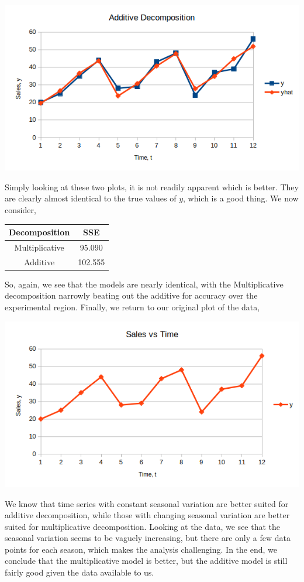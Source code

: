 \documentclass[letterpaper,10pt]{article}
\begin{document}
\begin{enumerate}
\begin{enumerate}
\begin{center}
\includegraphics[scale=0.8]{addhat.png}
\end{center}
Simply looking at these two plots, it is not readily apparent which is better. They are clearly almost identical to the true values of $y$, which is a good thing. We now consider,
\begin{center}
\begin{tabular}{|c|c|}
\hline
Decomposition & SSE\\\hline
Multiplicative & 95.090\\
Additive & 102.555\\\hline
\end{tabular}
\end{center}
So, again, we see that the models are nearly identical, with the Multiplicative decomposition narrowly beating out the additive for accuracy over the experimental region. Finally, we return to our original plot of the data,
\begin{center}
\includegraphics[scale=0.8]{oligopoly.png}
\end{center}
We know that time series with constant seasonal variation are better suited for additive decomposition, while those with changing seasonal variation are better suited for multiplicative decomposition. Looking at the data, we see that the seasonal variation seems to be vaguely increasing, but there are only a few data points for each season, which makes the analysis challenging. In the end, we conclude that the multiplicative model is better, but the additive model is still fairly good given the data available to us.

\end{enumerate}
\end{enumerate}
\end{document}
